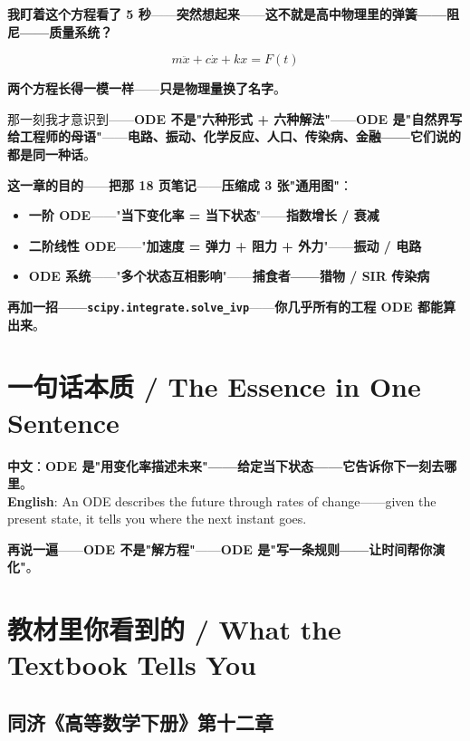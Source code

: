 \textbf{我盯着这个方程看了 5 秒}——\textbf{突然想起来}——\textbf{这不就是高中物理里的\textbf{弹簧——阻尼——质量}系统？}

\[
m \ddot{x} + c \dot{x} + k x = F(t)
\]

\textbf{两个方程长得一模一样}——\textbf{只是物理量换了名字}。

那一刻我才意识到——\textbf{ODE 不是"六种形式 + 六种解法"}——\textbf{ODE 是"自然界写给工程师的母语"}——\textbf{电路、振动、化学反应、人口、传染病、金融——它们说的都是同一种话}。

\textbf{这一章的目的}——\textbf{把那 18 页笔记}——\textbf{压缩成 3 张"通用图"}：

\begin{itemize}
\item \textbf{一阶 ODE}——"\textbf{当下变化率 = 当下状态}"——\textbf{指数增长 / 衰减}
\item \textbf{二阶线性 ODE}——"\textbf{加速度 = 弹力 + 阻力 + 外力}"——\textbf{振动 / 电路}
\item \textbf{ODE 系统}——"\textbf{多个状态互相影响}"——\textbf{捕食者——猎物 / SIR 传染病}
\end{itemize}

\textbf{再加一招——\texttt{scipy.integrate.solve\_ivp}}——\textbf{你几乎所有的工程 ODE 都能算出来}。

\section{一句话本质 / The Essence in One Sentence}

\begin{tcolorbox}[essbox={一句话本质}]
\textbf{中文}：\textbf{ODE 是"用变化率描述未来"——给定当下状态——它告诉你下一刻去哪里}。\\[6pt]
\textbf{English}: An ODE describes the future through rates of change——given the present state, it tells you where the next instant goes.
\end{tcolorbox}

\textbf{再说一遍}——\textbf{ODE 不是"解方程"}——\textbf{ODE 是"写一条规则——让时间帮你演化"}。

\section{教材里你看到的 / What the Textbook Tells You}

\subsection{同济《高等数学下册》第十二章}

